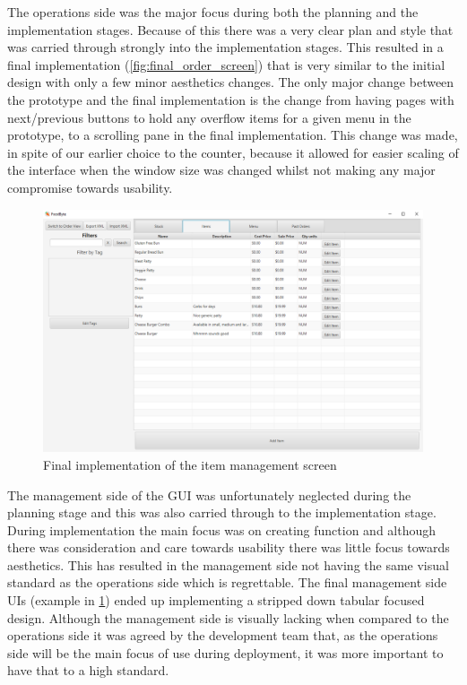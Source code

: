 The operations side was the major focus during both the planning and the implementation stages. Because of this there was a very clear plan and style that was carried through strongly into the implementation stages. This resulted in a final implementation (\ref{fig:final_order_screen}) that is very similar to the initial design with only a few minor aesthetics changes. The only major change between the prototype and the final implementation is the change from having pages with next/previous buttons to hold any overflow items for a given menu in the prototype, to a scrolling pane in the final implementation. This change was made, in spite of our earlier choice to the counter, because it allowed for easier scaling of the interface when the window size was changed whilst not making any major compromise towards usability.

\begin{figure}[ht]
	\centering
	\includegraphics[width=150mm]{images/Final_GUI/item_screen.png}
	\caption{Final implementation of the item management screen}
	\label{fig:final_item_screen}
\end{figure}

The management side of the GUI was unfortunately neglected during the planning stage and this was also carried through to the implementation stage. During implementation the main focus was on creating function and although there was consideration and care towards usability there was little focus towards aesthetics. This has resulted in the management side not having the same visual standard as the operations side which is regrettable. The final management side UIs (example in \ref{fig:final_item_screen}) ended up implementing a stripped down tabular focused design. Although the management side is visually lacking when compared to the operations side it was agreed by the development team that, as the operations side will be the main focus of use during deployment, it was more important to have that to a high standard.

